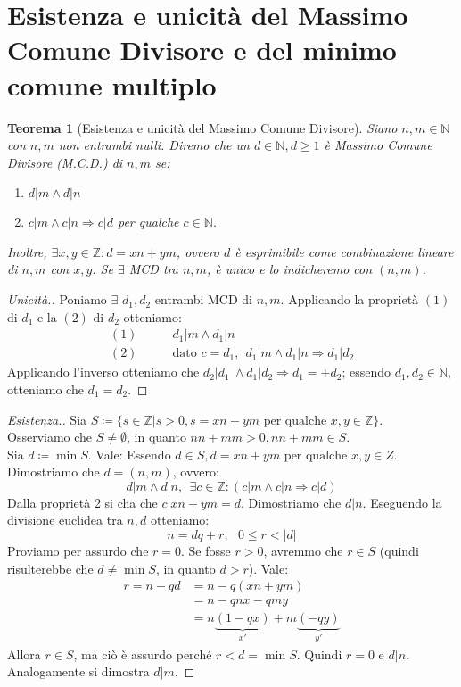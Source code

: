 \documentclass[12pt]{article}
\newcommand{\N}{\mathbb{N}}
\newcommand{\Z}{\mathbb{Z}}
\newcommand{\implica}{\Longrightarrow}
\newcommand{\pq}{\text{ per qualche }}
\renewcommand\qedsymbol{$\blacksquare$}
\newtheorem{theorem}{Teorema}
\begin{document}
\section{Esistenza e unicità del Massimo Comune Divisore e del minimo comune multiplo}
\begin{theorem}[Esistenza e unicità del Massimo Comune Divisore]
	Siano $n, m \in \N$ con $n, m$ non entrambi nulli. Diremo che un $d \in \N, d \ge 1$ è Massimo Comune Divisore (M.C.D.) di $n, m$ se:
	\begin{enumerate}
		\item$d | m \land d | n $
		\item$c | m \land c | n \implica c | d$ per qualche $c \in \N$.
	\end{enumerate}
	Inoltre, $\exists x, y \in \Z : d = xn + ym$, ovvero $d$ è esprimibile come combinazione lineare di $n, m$ con $x, y$.  Se $\exists$ MCD tra $n, m$, è unico e lo indicheremo con $(n, m)$.
\end{theorem}

\renewcommand\qedsymbol{$\square$}
\begin{proof}[Unicità.]
	Poniamo $\exists$ $d_1, d_2$ entrambi MCD di $n, m$. Applicando la proprietà $(1)$ di $d_1$ e la $(2)$ di $d_2$ otteniamo:
	\begin{align*}
		(1)\qquad & d_1 | m \land d_1 | n                                             \\
		(2)\qquad & \text{dato }c = d_1, \ \ d_1 | m \land d_1 | n \implica d_1 | d_2
	\end{align*}
	Applicando l'inverso otteniamo che $d_2 | d_1\ \land d_1 | d_2 \implica d_1 = \pm d_2$; essendo $d_1, d_2 \in \N$, otteniamo che
	$ d_1 = d_2$.
\end{proof}

\renewcommand\qedsymbol{$\blacksquare$}
\begin{proof}[Esistenza.]
	Sia $S \coloneqq \{ s \in \Z | s > 0, s = xn + ym \text{ per qualche } x, y \in \Z\}$.
	\\Osserviamo che $S \ne \emptyset$, in quanto $nn + mm > 0, nn + mm \in S$.
	\\Sia $d \coloneqq \min S$. Vale:
	Essendo $d \in S, d = xn+ym \pq x, y \in Z$. Dimostriamo che $d = (n,m)$, ovvero:
	$$ d | m \land d | n ,\ \ \exists c \in \Z : (c | m \land c | n \implica c | d)$$
	Dalla proprietà 2 si cha che $c | xn + ym = d$. Dimostriamo che $d | n$. Eseguendo la divisione euclidea tra $n, d$ otteniamo:
	$$n = dq + r, \text{ } 0 \le r < |d|$$
	Proviamo per assurdo che $r = 0$. Se fosse $r > 0$, avremmo che $r \in S$ (quindi risulterebbe che $d \ne \min S$, in quanto $d > r$). Vale:
	\begin{align*}
		r = n - qd & = n - q(xn+ym)                                         \\
		           & = n - qnx - qmy                                        \\
		           & = n\underbrace{(1-qx)}_{x'} + m\underbrace{(-qy)}_{y'}
	\end{align*}
	Allora $r \in S$, ma ciò è assurdo perché $r < d = \min S$. Quindi $r = 0$ e $d|n$. Analogamente si dimostra $d | m$.
\end{proof}
\end{document}
